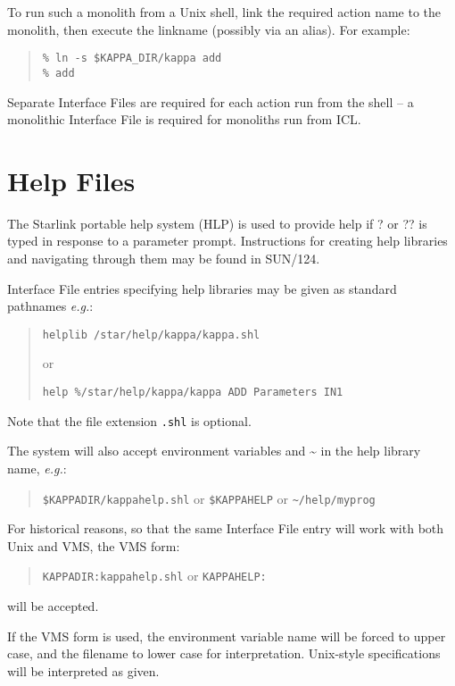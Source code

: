 \documentclass[twoside,11pt]{article}
\newcommand{\xref}[3]{#1}
\newcommand{\xlabel}[1]{}
\renewcommand{\_}{\texttt{\symbol{95}}}
\begin{document}
To run such a monolith from a Unix shell, link the required action name to the
monolith, then execute the linkname (possibly via an alias). For example:

\begin{quote} \begin{verbatim}
% ln -s $KAPPA_DIR/kappa add
% add
\end{verbatim} \end{quote}

Separate Interface Files are required for each action run from the shell 
-- a monolithic Interface File is required for monoliths run from ICL.

\section{\xlabel{help_files}Help Files}
The Starlink portable help system (HLP) is used to provide help if ? or ?? is 
typed in response to a parameter prompt.
Instructions for creating help libraries and navigating through them may be 
found in 
\xref{SUN/124}{sun124}{}.

Interface File entries specifying help libraries may be given as standard
pathnames \textit{e.g.}:
\begin{quote} 
\begin{verbatim}
helplib /star/help/kappa/kappa.shl
\end{verbatim}
or
\begin{verbatim}
help %/star/help/kappa/kappa ADD Parameters IN1
\end{verbatim} 
\end{quote}
Note that the file extension \texttt{.shl} is optional.

The system will also accept environment variables and \~{} in the help 
library name, \textit{e.g.}:
\begin{quote} 
\texttt{\$KAPPA\_DIR/kappahelp.shl} or \texttt{\$KAPPA\_HELP} or
\texttt{\~{}/help/myprog}
\end{quote}

For historical reasons, so that the same Interface File entry will work with
both Unix and VMS, the VMS form:
\begin{quote} 
\texttt{KAPPA\_DIR:kappahelp.shl} or \texttt{KAPPA\_HELP:}
\end{quote}
will be accepted.

If the VMS form is used, the environment variable name will be forced to upper
case, and the filename to lower case for interpretation. 
Unix-style specifications will be interpreted as given.
\end{document}
